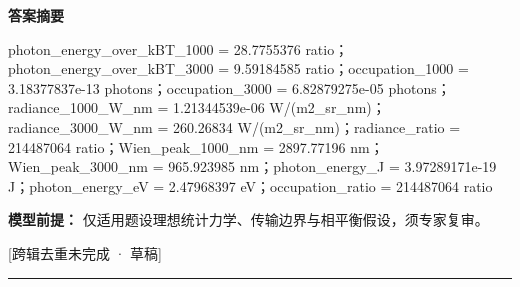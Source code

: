 \documentclass[UTF8,11pt,a4paper]{ctexart}
\begin{document}
\noindent\textbf{答案摘要}\par
photon\_energy\_over\_kBT\_1000 = 28.7755376 ratio；photon\_energy\_over\_kBT\_3000 = 9.59184585 ratio；occupation\_1000 = 3.18377837e-13 photons；occupation\_3000 = 6.82879275e-05 photons；radiance\_1000\_W\_nm = 1.21344539e-06 W/(m2\_sr\_nm)；radiance\_3000\_W\_nm = 260.26834 W/(m2\_sr\_nm)；radiance\_ratio = 214487064 ratio；Wien\_peak\_1000\_nm = 2897.77196 nm；Wien\_peak\_3000\_nm = 965.923985 nm；photon\_energy\_J = 3.97289171e-19 J；photon\_energy\_eV = 2.47968397 eV；occupation\_ratio = 214487064 ratio\par
\noindent\textbf{模型前提：}
仅适用题设理想统计力学、传输边界与相平衡假设，须专家复审。\par
\noindent\textcolor{red!65!black}{[跨辑去重未完成 · 草稿]} \par
\medskip\hrule\medskip
{}
\end{document}
